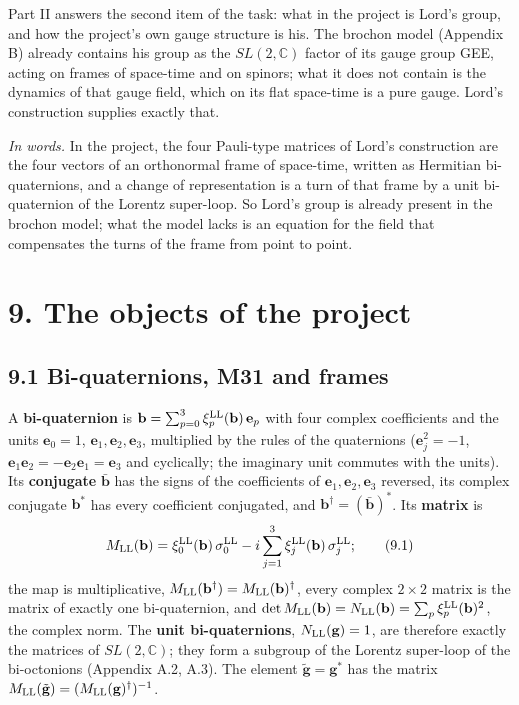 \documentclass[
  10pt,
]{article}
\begin{document}
Part II answers the second item of the task: what in the project is
Lord's group, and how the project's own gauge structure is his. The
brochon model (Appendix B) already contains his group as the
\(SL(2,\mathbb C)\) factor of its gauge group GEE, acting on frames of
space-time and on spinors; what it does not contain is the dynamics of
that gauge field, which on its flat space-time is a pure gauge. Lord's
construction supplies exactly that.

\emph{In words.} In the project, the four Pauli-type matrices of Lord's
construction are the four vectors of an orthonormal frame of space-time,
written as Hermitian bi-quaternions, and a change of representation is a
turn of that frame by a unit bi-quaternion of the Lorentz super-loop. So
Lord's group is already present in the brochon model; what the model
lacks is an equation for the field that compensates the turns of the
frame from point to point.

\hypertarget{the-objects-of-the-project}{%
\section{9. The objects of the
project}\label{the-objects-of-the-project}}

\hypertarget{bi-quaternions-m31-and-frames}{%
\subsection{9.1 Bi-quaternions, M31 and
frames}\label{bi-quaternions-m31-and-frames}}

A \textbf{bi-quaternion} is
\(\mathbf b=\sum_{p=0}^3\xi^{\rm LL}_p(\mathbf b)\,\mathbf e_p\) with
four complex coefficients and the units \(\mathbf e_0=1\),
\(\mathbf e_1,\mathbf e_2,\mathbf e_3\), multiplied by the rules of the
quaternions (\(\mathbf e_j^2=-1\),
\(\mathbf e_1\mathbf e_2=-\mathbf e_2\mathbf e_1=\mathbf e_3\) and
cyclically; the imaginary unit commutes with the units). Its
\textbf{conjugate} \(\bar{\mathbf b}\) has the signs of the coefficients
of \(\mathbf e_1,\mathbf e_2,\mathbf e_3\) reversed, its complex
conjugate \(\mathbf b^*\) has every coefficient conjugated, and
\(\mathbf b^\dagger=(\bar{\mathbf b})^*\). Its \textbf{matrix} is
\[M_{\rm LL}(\mathbf b)=\xi^{\rm LL}_0(\mathbf b)\,\sigma^{\rm LL}_0-i\sum_{j=1}^3\xi^{\rm LL}_j(\mathbf b)\,\sigma^{\rm LL}_j;\tag{9.1}\]
the map is multiplicative,
\(M_{\rm LL}(\mathbf b^\dagger)=M_{\rm LL}(\mathbf b)^\dagger\), every
complex \(2\times2\) matrix is the matrix of exactly one bi-quaternion,
and
\(\det M_{\rm LL}(\mathbf b)=N_{\rm LL}(\mathbf b)=\sum_p\xi^{\rm LL}_p(\mathbf b)^2\),
the complex norm. The \textbf{unit bi-quaternions},
\(N_{\rm LL}(\mathbf g)=1\), are therefore exactly the matrices of
\(SL(2,\mathbb C)\); they form a subgroup of the Lorentz super-loop of
the bi-octonions (Appendix A.2, A.3). The element
\(\tilde{\mathbf g}=\mathbf g^*\) has the matrix
\(M_{\rm LL}(\tilde{\mathbf g})=(M_{\rm LL}(\mathbf g)^\dagger)^{-1}\).
\end{document}
